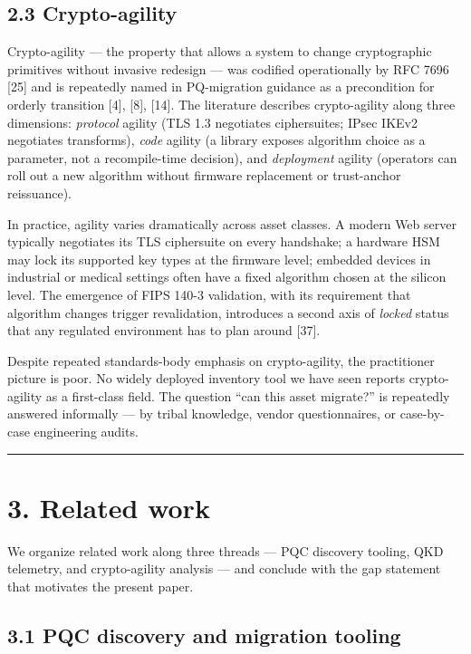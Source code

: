 \subsection{2.3 Crypto-agility}\label{crypto-agility}

Crypto-agility --- the property that allows a system to change
cryptographic primitives without invasive redesign --- was codified
operationally by RFC 7696 {[}25{]} and is repeatedly named in
PQ-migration guidance as a precondition for orderly transition {[}4{]},
{[}8{]}, {[}14{]}. The literature describes crypto-agility along three
dimensions: \emph{protocol} agility (TLS 1.3 negotiates ciphersuites;
IPsec IKEv2 negotiates transforms), \emph{code} agility (a library
exposes algorithm choice as a parameter, not a recompile-time decision),
and \emph{deployment} agility (operators can roll out a new algorithm
without firmware replacement or trust-anchor reissuance).

In practice, agility varies dramatically across asset classes. A modern
Web server typically negotiates its TLS ciphersuite on every handshake;
a hardware HSM may lock its supported key types at the firmware level;
embedded devices in industrial or medical settings often have a fixed
algorithm chosen at the silicon level. The emergence of FIPS 140-3
validation, with its requirement that algorithm changes trigger
revalidation, introduces a second axis of \emph{locked} status that any
regulated environment has to plan around {[}37{]}.

Despite repeated standards-body emphasis on crypto-agility, the
practitioner picture is poor. No widely deployed inventory tool we have
seen reports crypto-agility as a first-class field. The question ``can
this asset migrate?'' is repeatedly answered informally --- by tribal
knowledge, vendor questionnaires, or case-by-case engineering audits.

\begin{center}\rule{0.5\linewidth}{0.5pt}\end{center}

\section{3. Related work}\label{related-work}

We organize related work along three threads --- PQC discovery tooling,
QKD telemetry, and crypto-agility analysis --- and conclude with the gap
statement that motivates the present paper.

\subsection{3.1 PQC discovery and migration
tooling}\label{pqc-discovery-and-migration-tooling}

